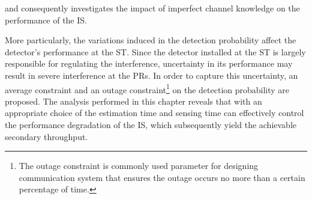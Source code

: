  and consequently investigates the impact of imperfect channel knowledge on the performance of the IS. 

More particularly, the variations induced in the detection probability affect the detector's performance at the ST. Since the detector installed at the ST is largely responsible for regulating the interference, uncertainty in its performance may result in severe interference at the PRs. In order to capture this uncertainty, an average constraint and an outage constraint\footnote{The outage constraint is commonly used parameter for designing communication system that ensures the outage occurs no more than a certain percentage of time.} on the detection probability are proposed.
The analysis performed in this chapter reveals that with an appropriate choice of the estimation time and sensing time can effectively control the performance degradation of the IS, which subsequently yield the achievable secondary throughput.





